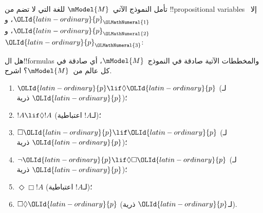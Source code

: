 \documentclass[../../../include/open-logic-section]{subfiles}
\begin{document}
\begin{prob}
  تأمل النموذج الآتي~$\mModel{M}$ للغة التي لا تضم من
  !!{propositional variable}s إلا~$\OLId{latin-ordinary}{p}_\OLMathNumeral{1}$، و$\OLId{latin-ordinary}{p}_\OLMathNumeral{2}$، و$\OLId{latin-ordinary}{p}_\OLMathNumeral{3}$:
  \begin{center}
  \end{center}
  هل ال!!{formula}s والمخططات الآتية صادقة في النموذج~$\mModel{M}$،
  أي صادقة في كل عالم من~$\mModel{M}$؟ اشرح.
  \begin{enumerate}
  \item $\OLId{latin-ordinary}{p}\lif \Diamond \OLId{latin-ordinary}{p}$ (لـ$\OLId{latin-ordinary}{p}$ ذرية)؛
  \item $!A\lif \Diamond !A$ (لـ$!A$ اعتباطية)؛
  \item $\Box \OLId{latin-ordinary}{p} \lif \OLId{latin-ordinary}{p}$ (لـ$\OLId{latin-ordinary}{p}$ ذرية)؛
  \item $\lnot \OLId{latin-ordinary}{p} \lif \Diamond \Box \OLId{latin-ordinary}{p}$ (لـ$\OLId{latin-ordinary}{p}$ ذرية)؛
  \item $\Diamond \Box !A$ (لـ$!A$ اعتباطية)؛
  \item $\Box \Diamond \OLId{latin-ordinary}{p}$ (لـ$\OLId{latin-ordinary}{p}$ ذرية).
  \end{enumerate}
\end{prob}
\end{document}
